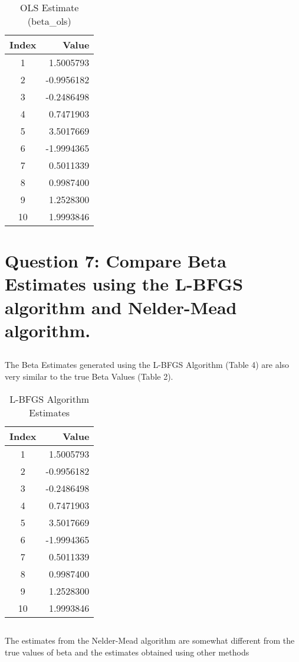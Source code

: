 \documentclass{article}
\begin{document}
\begin{table}[htbp]
\centering
\caption{OLS Estimate (beta\_ols)}
\begin{tabular}{cr}
\hline
Index & Value \\
\hline
1 & 1.5005793 \\
2 & -0.9956182 \\
3 & -0.2486498 \\
4 & 0.7471903 \\
5 & 3.5017669 \\
6 & -1.9994365 \\
7 & 0.5011339 \\
8 & 0.9987400 \\
9 & 1.2528300 \\
10 & 1.9993846 \\
\hline
\end{tabular}
\end{table}
\section{Question 7: Compare Beta Estimates using  the  L-BFGS algorithm and Nelder-Mead
algorithm.}

\subsection{}
The Beta Estimates generated using the L-BFGS Algorithm (Table 4) are also very similar to the true Beta Values (Table 2).

\begin{table}[htbp]
\centering
\caption{L-BFGS Algorithm Estimates}
\begin{tabular}{cr}
\hline
Index & Value \\
\hline
1 & 1.5005793 \\
2 & -0.9956182 \\
3 & -0.2486498 \\
4 & 0.7471903 \\
5 & 3.5017669 \\
6 & -1.9994365 \\
7 & 0.5011339 \\
8 & 0.9987400 \\
9 & 1.2528300 \\
10 & 1.9993846 \\
\hline
\end{tabular}
\end{table}

\subsection{}
The estimates from the Nelder-Mead algorithm are somewhat different from the true values of beta and the estimates obtained using other methods
\end{document}
